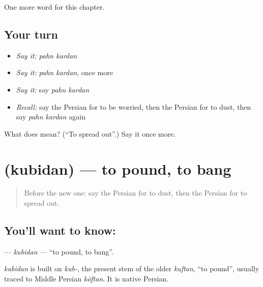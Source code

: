 \begin{grammarlens}[title={What you've built}]
One more word for this chapter.
\end{grammarlens}

\subsection*{Your turn}
\begin{itemize}
\raggedright
  \item \emph{Say it:} \emph{pahn kardan}
  \item \emph{Say it:} \emph{pahn kardan}, once more
  \item \emph{Say it:} say \emph{pahn kardan}
  \item \emph{Recall:} say the Persian for to be worried, then the Persian for to dust, then say \emph{pahn kardan} again
\end{itemize}

\begin{tcolorbox}[breakable,colback=teal!4,colframe=teal!35!black,title={Before you move on}]
What does   mean? (\textquotedblleft{}To spread out\textquotedblright{}.) Say it once more.
\end{tcolorbox}
\section[\texorpdfstring{\fa{کوبیدن} (kubidan)}{کوبیدن (kubidan)}]{ (kubidan) — to pound, to bang}

\label{lesson:FA-C147-kubidan}



\begin{quote}
Before the new one: say the Persian for to dust, then the Persian for to spread out.
\end{quote}

\subsection*{You'll want to know: }
\textbf{} — \emph{kubidan} — \textquotedblleft{}to pound, to bang\textquotedblright{}.

\begin{cousinweb}
\emph{kubidan} is built on \emph{kub-}, the present stem of the older \emph{kuftan}, \textquotedblleft{}to pound\textquotedblright{}, usually traced to Middle Persian \emph{kōftan}. It is native Persian.
\end{cousinweb}


